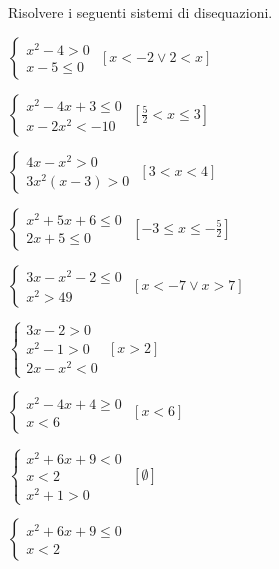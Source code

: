 \begin{esercizio}[\Ast]
 \label{ese:4.75}
Risolvere i seguenti sistemi di disequazioni.
\begin{multicols}{2}
\begin{enumeratea}
\item \(\left\{\begin{array}{l}x^2-4>0\\x-5\le 0\end{array}\right.\) 
 \hfill \(\left[x<-2\vee 2<x\right]\)
\item \(\left\{\begin{array}{l}x^2-4x+3\le 0\\x-2x^2<-10\end{array}\right.\)
 \hfill \(\left[\frac 5 2<x\le 3\right]\)
\item \(\left\{\begin{array}{l}4x-x^2>0\\3x^2(x-3)>0\end{array}\right.\)
 \hfill \(\left[3<x<4\right]\)
\item \(\left\{\begin{array}{l}x^2+5x+6\le 0\\2x+5\le 0\end{array}\right.\)
 \hfill \(\left[-3\le x\le -\frac 5 2\right]\)
\item \(\left\{\begin{array}{l}3x-x^2-2\le 0\\x^2>49\end{array}\right.\)
 \hfill \(\left[x<-7\vee x>7\right]\)
\item \(\left\{\begin{array}{l}3x-2>0\\x^2-1>0\\2x-x^2<0\end{array}\right.\)
 \hfill \(\left[x>2\right]\)
\item \(\left\{\begin{array}{l}x^2-4x+4\ge 0\\x<6\end{array}\right.\)
 \hfill \(\left[x<6\right]\)
\item \(\left\{\begin{array}{l}x^2+6x+9<0\\x<2\\x^2+1>0\end{array}\right.\)
 \hfill \(\left[\emptyset\right]\)
\item \(\left\{\begin{array}{l}x^2+6x+9\le 0\\x<2\end{array}\right.\)

\end{enumeratea}
\end{multicols}
\end{esercizio}
